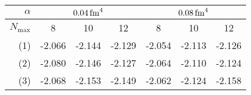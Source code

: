 \begin{table}[H]
  \caption{Extrapolation results in \si[]{\mega\electronvolt} of the difference-based framework for the nuclei  \textbf{(a)},  \textbf{(b)} and  \textbf{(c)}. For each interaction characterized by the flow parameter $\alpha = \srg{0.04}, \srg{0.08}$, the final extrapolation results for the given $N_\mathrm{max}$ value is shown. Here, \textbf{(1)} is our basic extrapolation without further modifications of the training process, \textbf{(2)} is the $N_\mathrm{max}$-limitation training mode, \textbf{(3)} is the SRG-filter training mode. }
  \label{tab:eval_diff}
  \centering
  \begin{subtable}{\textwidth}
    \caption{}
    \centering
    \begin{tabular}{
        r|
        S[table-format=-2.3(3)]
        S[table-format=-2.3(3)]
        S[table-format=-2.3(3)]
        S[table-format=-2.3(3)]
        S[table-format=-2.3(3)]
        S[table-format=-2.3(3)]
      }
      \toprule
      $\alpha$                         &
       &
         \\
      \midrule
      $N_\mathrm{max}$                 &
      {8}                              &
      {10}                             &
      {12}                             &
      {8}                              &
      {10}                             &
      {12}                               \\
      \midrule
      (1)                              &
      -2.066                  &
      -2.144                  &
      -2.129                  &
      -2.054                  &
      -2.113                  &
      -2.126                    \\
      (2)                              &
      -2.080                  &
      -2.146                  &
      -2.127                  &
      -2.064                  &
      -2.110                  &
      -2.124                    \\
      (3)                              &
      -2.068                  &
      -2.153                  &
      -2.149                  &
      -2.062                  &
      -2.124                  &
      -2.158                    \\
      \bottomrule
    \end{tabular}

\end{subtable}
\end{table}
